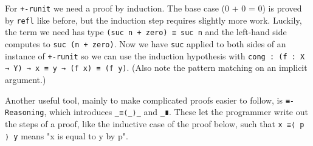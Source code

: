 For \texttt{+-runit} we need a proof by induction. The base case (0 + 0 = 0) is proved by \texttt{refl}
like before, but the induction step requires slightly more work.
Luckily, the term we need has type \texttt{(suc n + zero) ≡ suc n} and the left-hand side computes to \texttt{suc (n + zero)}.
Now we have \texttt{suc} applied to both sides of an instance of \texttt{+-runit} so we can use the induction hypothesis with \texttt{cong : (f : X → Y) → x ≡ y → (f x) ≡ (f y)}.
(Also note the pattern matching on an implicit argument.)

Another useful tool, mainly to make complicated proofs easier to follow, is \texttt{≡-Reasoning},
which introduces \texttt{\_≡⟨\_⟩\_} and \texttt{\_∎}.
These let the programmer write out the steps of a proof, like the inductive case of the proof below,
such that \texttt{x ≡⟨ p ⟩ y} means "x is equal to y by p".
